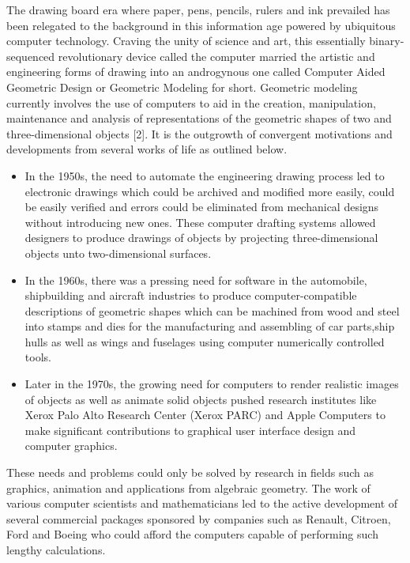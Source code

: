 \hspace{30}The drawing board era where paper, pens, pencils, rulers and ink  
prevailed has been relegated to the background in this information age 
powered by ubiquitous computer technology. Craving the unity of science and  
art, this essentially binary­-sequenced revolutionary device called the computer  
married the artistic and engineering forms of drawing into an androgynous one  
called Computer­ Aided Geometric Design or Geometric Modeling for short.
Geometric modeling currently involves the use of computers to aid in the  
creation, manipulation, maintenance and analysis of representations of the  
geometric shapes of two and three-­dimensional objects [2]. It is the outgrowth  
of convergent motivations and developments from several works of life as  
outlined below.
\begin{itemize}
\item In the 1950s, the need to automate the engineering drawing process led
to electronic drawings which could be archived and modified more easily,
could be easily verified and errors could be eliminated from mechanical 
designs without introducing new ones. These computer drafting systems
allowed designers to produce drawings of objects by projecting
three-­dimensional objects unto two-­dimensional surfaces.
\item In the 1960s, there was a pressing need for software in the
automobile, shipbuilding and aircraft industries to produce
computer-­compatible descriptions of geometric shapes which can be
machined from wood and steel into stamps and dies for the
manufacturing and assembling of car parts,ship hulls as well as wings and  
fuselages using computer numerically controlled tools.
\item Later in the 1970s, the growing need for computers to render realistic
images of objects as well as animate solid objects pushed research
institutes like Xerox Palo Alto Research Center (Xerox PARC) and Apple
Computers to make significant contributions to graphical user­ interface
design and computer graphics.  
\end{itemize}

These needs and problems could only be solved by research in fields such as
graphics, animation and applications from algebraic geometry. The work of
various computer scientists and mathematicians led to the active development
of several commercial packages sponsored by companies such as Renault,
Citroen, Ford and Boeing who could afford the computers capable of  
performing such lengthy calculations.  

